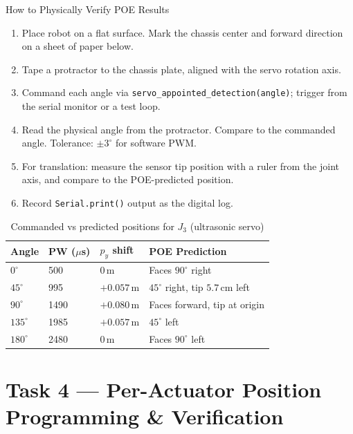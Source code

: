 \documentclass[12pt,a4paper]{article}
\begin{document}
\begin{donebox}{How to Physically Verify POE Results}
\begin{enumerate}[leftmargin=1.5em]
  \item Place robot on a flat surface. Mark the chassis center and forward
        direction on a sheet of paper below.
  \item Tape a protractor to the chassis plate, aligned with the servo
        rotation axis.
  \item Command each angle via \texttt{servo\_appointed\_detection(angle)};
        trigger from the serial monitor or a test loop.
  \item Read the physical angle from the protractor. Compare to the
        commanded angle. Tolerance: $\pm 3^\circ$ for software PWM.
  \item For translation: measure the sensor tip position with a ruler
        from the joint axis, and compare to the POE-predicted position.
  \item Record \texttt{Serial.print()} output as the digital log.
\end{enumerate}
\end{donebox}

\begin{table}[h!]
\centering
\caption{Commanded vs predicted positions for $J_3$ (ultrasonic servo)}
\renewcommand{\arraystretch}{1.3}
\begin{tabular}{C{1.8cm} C{2cm} C{2cm} L{4cm}}
\toprule
{}
\color{white}\textbf{Angle} &
\color{white}\textbf{PW ($\mu$s)} &
\color{white}\textbf{$p_y$ shift} &
\color{white}\textbf{POE Prediction} \\
\midrule
$0^\circ$   & 500  & $0$\,m   & Faces $90^\circ$ right \\
$45^\circ$  & 995  & $+0.057$\,m & $45^\circ$ right, tip $5.7$\,cm left \\
$90^\circ$  & 1490 & $+0.080$\,m & Faces forward, tip at origin \\
$135^\circ$ & 1985 & $+0.057$\,m & $45^\circ$ left \\
$180^\circ$ & 2480 & $0$\,m   & Faces $90^\circ$ left \\
\bottomrule
\end{tabular}
\end{table}

\newpage
\section{Task 4 --- Per-Actuator Position Programming \& Verification}
\end{document}
